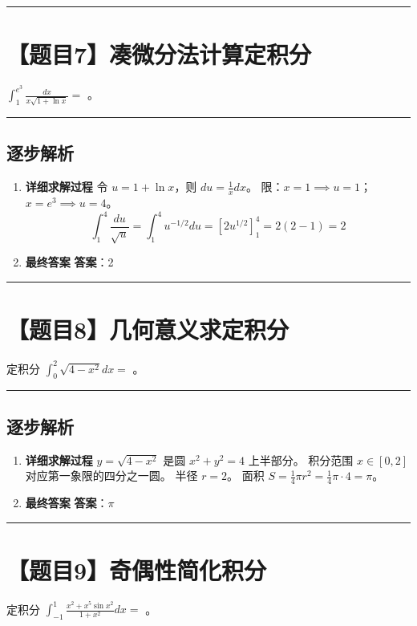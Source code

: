 \documentclass[UTF8]{ctexart}
\newenvironment{redenv}{\color{red}}{}
\newenvironment{detailedanalysis}{%
    \color{red}
    \begin{enumerate}[label=\textbf{第\arabic*步：}, leftmargin=*, align=left, itemsep=1.5ex]
}{%
    \end{enumerate}
}
\newcommand{\problemrule}{\noindent\rule{\textwidth}{1.5pt}\vspace{-0.8em}}
\newcommand{\analysisrule}{\noindent\rule{\textwidth}{0.8pt}\vspace{-0.8em}}
\newcommand{\blank}[1]{\underline{\hspace{#1}}}
\begin{document}
\problemrule
\section*{【题目7】凑微分法计算定积分}
$ \int_{1}^{e^{3}}\frac{dx}{x\sqrt{1+\ln x}}= $ \blank{2cm}。

\begin{redenv}
\analysisrule
\subsection*{逐步解析}

\begin{detailedanalysis}
\item \textbf{详细求解过程}
令 $u = 1 + \ln x$，则 $du = \frac{1}{x} dx$。
限：$x=1 \implies u=1$；$x=e^3 \implies u=4$。
$$ \int_1^4 \frac{du}{\sqrt{u}} = \int_1^4 u^{-1/2} du = [2u^{1/2}]_1^4 = 2(2 - 1) = 2 $$

\item \textbf{最终答案}
\textbf{答案}：2
\end{detailedanalysis}
\end{redenv}

\problemrule
\section*{【题目8】几何意义求定积分}
定积分 $ \int_{0}^{2}\sqrt{4-x^{2}}dx= $ \blank{2cm}。

\begin{redenv}
\analysisrule
\subsection*{逐步解析}

\begin{detailedanalysis}
\item \textbf{详细求解过程}
$y = \sqrt{4-x^2}$ 是圆 $x^2 + y^2 = 4$ 上半部分。
积分范围 $x \in [0, 2]$ 对应第一象限的四分之一圆。
半径 $r=2$。
面积 $S = \frac{1}{4} \pi r^2 = \frac{1}{4} \pi \cdot 4 = \pi$。

\item \textbf{最终答案}
\textbf{答案}：$ \pi $
\end{detailedanalysis}
\end{redenv}

\problemrule
\section*{【题目9】奇偶性简化积分}
定积分 $ \int_{-1}^{1}\frac{x^{2}+x^{5}\sin x^{2}}{1+x^{2}}dx= $ \blank{2cm}。
\end{document}
